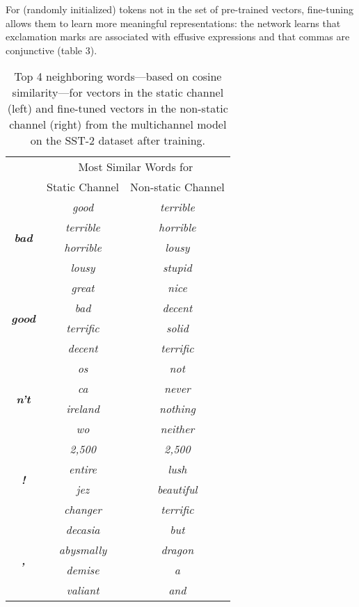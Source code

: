 \documentclass[11pt]{article}
\begin{document}
For (randomly initialized) tokens not in the set of pre-trained vectors, fine-tuning allows them to learn more meaningful representations: the network learns that exclamation marks are  associated with effusive expressions and that commas are conjunctive (table 3).
\begin{table}
\centering
\begin{tabular}{c|c|c} \hline
\multirow{2}{*}{} & \multicolumn{2}{c}{Most Similar Words for} \\ \cline{2-3} & Static Channel & Non-static Channel \\ \hline
\multirow{4}{*}{\it{\textbf{bad}}} & \it{good} & \it{terrible} \\ & \it{terrible} & \it{horrible} \\ & \it{horrible} & \it{lousy} \\ & \it{lousy} & \it{stupid} \\ \hline
\multirow{4}{*}{\it{\textbf{good}}} & \it{great} & \it{nice} \\ & \it{bad} & \it{decent} \\ & \it{terrific} & \it{solid} \\ & \it{decent} & \it{terrific} \\ \hline
\multirow{4}{*}{\it{\textbf{n't}}} & \it{os} & \it{not} \\ & \it{ca} & \it{never} \\ & \it{ireland} & \it{nothing} \\ & \it{wo} & \it{neither} \\ \hline
\multirow{4}{*}{\it{\textbf{!}}} & \it{2,500} & \it{2,500} \\ & \it{entire} & \it{lush} \\ & \it{jez} & \it{beautiful} \\ & \it{changer} & \it{terrific} \\ \hline
\multirow{4}{*}{\it{\textbf{,}}} & \it{decasia} & \it{but} \\ & \it{abysmally} & \it{dragon} \\ & \it{demise} & \it{a} \\  & \it{valiant} & \it{and} \\ \hline
\end{tabular}
\caption{Top 4 neighboring words---based on cosine similarity---for vectors in the static channel (left) and fine-tuned vectors in the non-static channel (right) from the multichannel model on the SST-2 dataset after training.}
\end{table}
\end{document}
